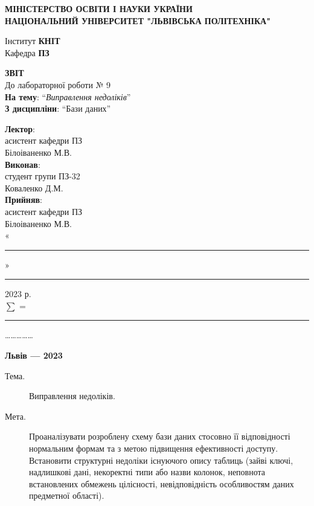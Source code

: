 \documentclass[14pt]{extreport}
\newcommand\subject{Бази даних}
\newcommand\lecturer{асистент кафедри ПЗ\\Білоіваненко М.В.}
\newcommand\teacher{асистент кафедри ПЗ\\Білоіваненко М.В.}
\newcommand\mygroup{ПЗ-32}
\newcommand\lab{9}
\newcommand\theme{Виправлення недоліків}
\newcommand\purpose{Проаналізувати розроблену схему бази даних стосовно її відповідності нормальним формам та з метою підвищення ефективності доступу. Встановити структурні недоліки існуючого опису таблиць (зайві ключі, надлишкові дані, некоректні типи або назви колонок, неповнота встановлених обмежень цілісності, невідповідність особливостям даних предметної області)}
\begin{document}
\begin{normalsize}
	\begin{titlepage}
		\thispagestyle{empty}
		\begin{center}
			\textbf{МІНІСТЕРСТВО ОСВІТИ І НАУКИ УКРАЇНИ\\
				НАЦІОНАЛЬНИЙ УНІВЕРСИТЕТ "ЛЬВІВСЬКА ПОЛІТЕХНІКА"}
		\end{center}
		\begin{flushright}
			Інститут \textbf{КНІТ}\\
			Кафедра \textbf{ПЗ}
		\end{flushright}
		\vspace{200pt}
		\begin{center}
			\textbf{ЗВІТ}\\
			\vspace{10pt}
			До лабораторної роботи № \lab\\
			\textbf{На тему}: “\textit{\theme}”\\
			\textbf{З дисципліни}: “\subject”
		\end{center}
		\vspace{40pt}
		\begin{flushright}
			
			\textbf{Лектор}:\\
			\lecturer\\
			\vspace{10pt}
			\textbf{Виконав}:\\
			
			студент групи \mygroup\\
			Коваленко Д.М.\\
			\vspace{10pt}
			\textbf{Прийняв}:\\
			
			\teacher\\
			
			\vspace{28pt}
			«\rule{1cm}{0.15mm}» \rule{1.5cm}{0.15mm} 2023 р.\\
			$\sum$ = \rule{1cm}{0.15mm}……………\\
			
		\end{flushright}
		\vspace{\fill}
		\begin{center}
			\textbf{Львів — 2023}
		\end{center}
	\end{titlepage}
		
	\begin{description}
		\item[Тема.] \theme.
		\item[Мета.] \purpose.
	\end{description}


\end{normalsize}
\end{document}
